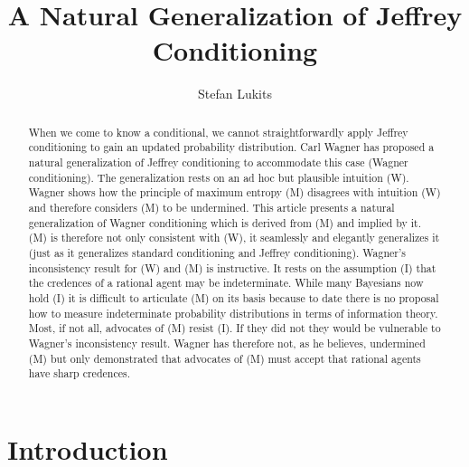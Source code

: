 \documentclass[11pt]{article}
\begin{document}

\title{A Natural Generalization of Jeffrey Conditioning}
\author{Stefan Lukits}


\date{}



\begin{abstract} 
  {\noindent}When we come to know a conditional, we cannot
  straightforwardly apply Jeffrey conditioning to gain an updated
  probability distribution. Carl Wagner has proposed a natural
  generalization of Jeffrey conditioning to accommodate this case
  (Wagner conditioning). The generalization rests on an ad hoc but
  plausible intuition (W). Wagner shows how the principle of maximum
  entropy (M) disagrees with intuition (W) and therefore considers (M)
  to be undermined. This article presents a natural generalization of
  Wagner conditioning which is derived from (M) and implied by it. (M)
  is therefore not only consistent with (W), it seamlessly and
  elegantly generalizes it (just as it generalizes standard
  conditioning and Jeffrey conditioning). Wagner's inconsistency
  result for (W) and (M) is instructive. It rests on the assumption
  (I) that the credences of a rational agent may be indeterminate.
  While many Bayesians now hold (I) it is difficult to articulate (M)
  on its basis because to date there is no proposal how to measure
  indeterminate probability distributions in terms of information
  theory. Most, if not all, advocates of (M) resist (I). If they did
  not they would be vulnerable to Wagner's inconsistency result.
  Wagner has therefore not, as he believes, undermined (M) but only
  demonstrated that advocates of (M) must accept that rational agents
  have sharp credences.
\end{abstract}

\section{Introduction}
\label{Introduction}
\end{document}
